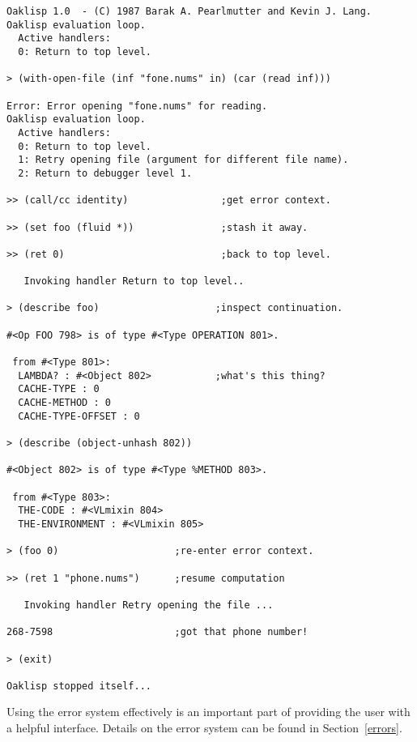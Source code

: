\begin{verbatim}
Oaklisp 1.0  - (C) 1987 Barak A. Pearlmutter and Kevin J. Lang.
Oaklisp evaluation loop.
  Active handlers:
  0: Return to top level.

> (with-open-file (inf "fone.nums" in) (car (read inf)))

Error: Error opening "fone.nums" for reading.
Oaklisp evaluation loop.
  Active handlers:
  0: Return to top level.
  1: Retry opening file (argument for different file name).
  2: Return to debugger level 1.

>> (call/cc identity)                ;get error context.

>> (set foo (fluid *))               ;stash it away.

>> (ret 0)                           ;back to top level.

   Invoking handler Return to top level..

> (describe foo)                    ;inspect continuation.

#<Op FOO 798> is of type #<Type OPERATION 801>.

 from #<Type 801>:
  LAMBDA? : #<Object 802>           ;what's this thing?
  CACHE-TYPE : 0
  CACHE-METHOD : 0
  CACHE-TYPE-OFFSET : 0

> (describe (object-unhash 802))

#<Object 802> is of type #<Type %METHOD 803>.

 from #<Type 803>:
  THE-CODE : #<VLmixin 804>
  THE-ENVIRONMENT : #<VLmixin 805>

> (foo 0)                    ;re-enter error context.

>> (ret 1 "phone.nums")      ;resume computation

   Invoking handler Retry opening the file ...

268-7598                     ;got that phone number!

> (exit)

Oaklisp stopped itself...
\end{verbatim}

Using the error system effectively is an important part of providing
the user with a helpful interface.  Details on the error system can be
found in Section~\ref{errors}.
